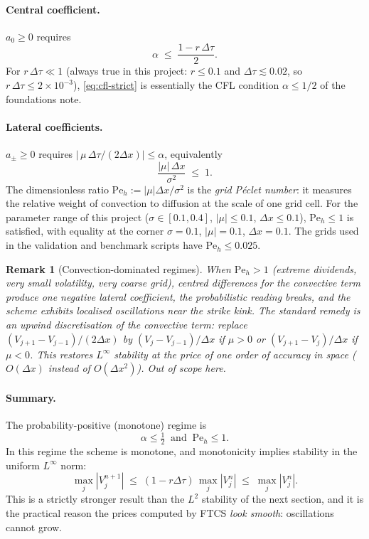 \documentclass[11pt,a4paper]{article}
\newtheorem{remark}[proposition]{Remark}
\begin{document}
\paragraph{Central coefficient.}
$a_0 \ge 0$ requires
\begin{equation}
\alpha \;\le\; \frac{1 - r\,\Delta\tau}{2}.
\label{eq:cfl-strict}
\end{equation}
For $r\,\Delta\tau \ll 1$ (always true in this project: $r \le 0.1$
and $\Delta\tau \lesssim 0.02$, so $r\,\Delta\tau \le 2 \times 10^{-3}$),
\eqref{eq:cfl-strict} is essentially
the CFL condition $\alpha \le 1/2$ of the foundations note.

\paragraph{Lateral coefficients.}
$a_\pm \ge 0$ requires $\bigl|\,\mu\,\Delta\tau/(2\Delta x)\bigr|\le
\alpha$, equivalently
\begin{equation}
\frac{|\mu|\,\Delta x}{\sigma^2} \;\le\; 1.
\label{eq:peclet}
\end{equation}
The dimensionless ratio $\mathrm{Pe}_h := |\mu|\Delta x / \sigma^2$ is
the \emph{grid Péclet number}: it measures the relative weight of
convection to diffusion at the scale of one grid cell. For the
parameter range of this project ($\sigma \in [0.1, 0.4]$,
$|\mu| \le 0.1$, $\Delta x \le 0.1$), $\mathrm{Pe}_h \le 1$ is
satisfied, with equality at the corner $\sigma = 0.1$, $|\mu| = 0.1$,
$\Delta x = 0.1$. The grids used in the validation and benchmark
scripts have $\mathrm{Pe}_h \le 0.025$.

\begin{remark}[Convection-dominated regimes]
When $\mathrm{Pe}_h > 1$ (extreme dividends, very small volatility,
very coarse grid), centred differences for the convective term
produce one negative lateral coefficient, the probabilistic reading
breaks, and the scheme exhibits localised oscillations near the
strike kink. The standard remedy is an \emph{upwind} discretisation
of the convective term: replace
$(V_{j+1} - V_{j-1}) / (2\Delta x)$ by $(V_j - V_{j-1})/\Delta x$ if
$\mu > 0$ or $(V_{j+1} - V_j)/\Delta x$ if $\mu < 0$. This restores
$L^\infty$ stability at the price of one order of accuracy in space
($O(\Delta x)$ instead of $O(\Delta x^2)$). Out of scope here.
\end{remark}

\paragraph{Summary.}
The probability-positive (monotone) regime is
\begin{equation}
\boxed{\;\;\alpha \le \tfrac{1}{2}\;\;\text{and}\;\;\mathrm{Pe}_h \le 1.\;\;}
\label{eq:ppos}
\end{equation}
In this regime the scheme is monotone, and monotonicity implies
stability in the uniform $L^\infty$ norm:
\[
\max_j |V_j^{n+1}|
\;\le\; (1 - r\Delta\tau)\,\max_j |V_j^n|
\;\le\; \max_j |V_j^n|.
\]
This is a strictly stronger result than the $L^2$ stability of the
next section, and it is the practical reason the prices computed by
FTCS \emph{look smooth}: oscillations cannot grow.
\end{document}
